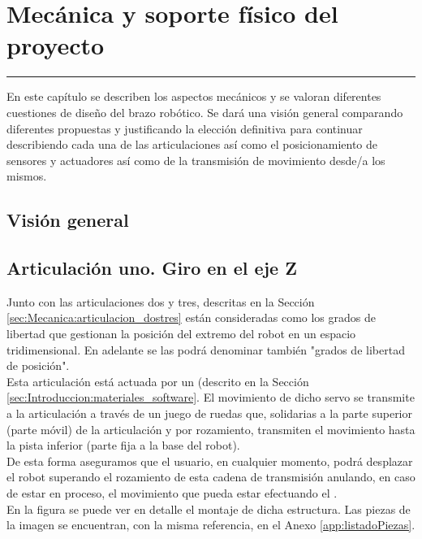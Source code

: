 \chapter{Mecánica y soporte físico del proyecto} \label{chap:Mecanica}
\hrule
\vspace{3mm}

En este capítulo se describen los aspectos mecánicos y se valoran diferentes cuestiones de diseño del brazo robótico. Se dará una visión general comparando diferentes propuestas y justificando la elección definitiva para continuar describiendo cada una de las articulaciones así como el posicionamiento de sensores y actuadores así como de la transmisión de movimiento desde/a los mismos.
 
\section{Visión general} \label{sec:Mecanica:vision_general}

\section{Articulación uno. Giro en el eje Z} \label{sec:Mecanica:articulacion_uno}
    Junto con las articulaciones dos y tres, descritas en la Sección \ref{sec:Mecanica:articulacion_dostres} están consideradas como los grados de libertad que gestionan la posición del extremo del robot en un espacio tridimensional. En adelante se las podrá denominar también "grados de libertad de posición".
    \\ 
    
    Esta articulación está actuada por un  (descrito en la Sección \ref{sec:Introduccion:materiales_software}. El movimiento de dicho servo se transmite a la articulación a través de un juego de ruedas que, solidarias a la parte superior (parte móvil) de la articulación y por rozamiento, transmiten el movimiento hasta la pista inferior (parte fija a la base del robot).
    \\ 
    
    De esta forma aseguramos que el usuario, en cualquier momento, podrá desplazar el robot superando el rozamiento de esta cadena de transmisión anulando, en caso de estar en proceso, el movimiento que pueda estar efectuando el .
	\\ 
	En la figura \completar se puede ver en detalle el montaje de dicha estructura. Las piezas de la imagen se encuentran, con la misma referencia, en el Anexo \ref{app:listadoPiezas}.
	
